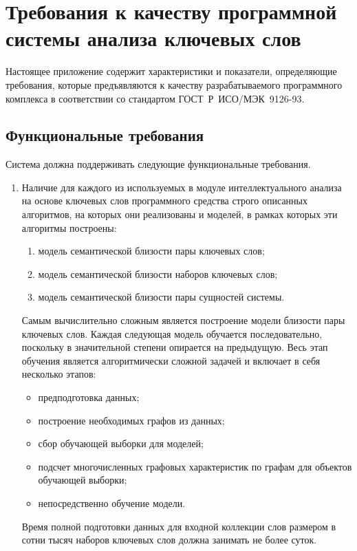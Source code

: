 \chapter{Требования к качеству программной системы анализа ключевых слов } \label{AppendixRequirements}
Настоящее приложение содержит характеристики и показатели, определяющие требования, которые предъявляются к качеству разрабатываемого программного комплекса в соответствии со стандартом \mbox{ГОСТ Р ИСО/МЭК 9126-93}.
\section{Функциональные требования}
Система должна поддерживать следующие функциональные требования.
\begin{enumerate}
    \item Наличие для каждого из используемых в модуле интеллектуального анализа на основе ключевых слов программного средства строго описанных алгоритмов, на которых они реализованы и моделей, в рамках которых эти алгоритмы построены:
    \begin{enumerate}
        \item  модель семантической близости пары ключевых слов;
        \item  модель семантической близости наборов ключевых слов;
        \item  модель семантической близости пары сущностей системы.
    \end{enumerate}
    Самым вычислительно сложным является построение модели близости пары ключевых слов. Каждая следующая модель обучается последовательно, поскольку в значительной степени опирается на предыдущую. Весь этап обучения является алгоритмически сложной задачей и включает в себя несколько этапов:
        \begin{itemize}
            \item предподготовка данных;
            \item построение необходимых графов из данных;
            \item сбор обучающей выборки для моделей;
            \item подсчет многочисленных графовых характеристик по графам для объектов обучающей выборки;
            \item непосредственно обучение модели.
        \end{itemize}
        Время полной подготовки данных для входной коллекции слов размером в сотни тысяч наборов ключевых слов должна занимать не более суток.

\end{enumerate}
